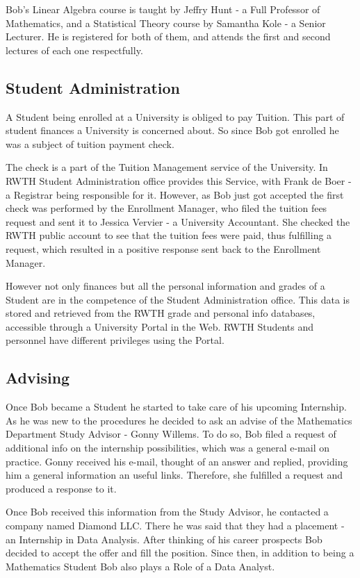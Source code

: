\documentclass{article}    %
\begin{document}
Bob's Linear Algebra course is taught by Jeffry Hunt - a Full Professor of Mathematics, and a Statistical Theory course by Samantha Kole - a Senior Lecturer. He is registered for both of them, and attends the first and second lectures of each one respectfully.
% 
\subsection{Student Administration}
%
A Student being enrolled at a University is obliged to pay Tuition. This part of student finances a University is concerned about. So since Bob got enrolled he was a subject of tuition payment check. 

The check is a part of the Tuition Management service of the University. In RWTH Student Administration office provides this Service, with Frank de Boer - a Registrar being responsible for it. However, as Bob just got accepted the first check was performed by the Enrollment Manager, who filed the tuition fees request and sent it to Jessica Vervier - a University Accountant. She checked the RWTH public account to see that the tuition fees were paid, thus fulfilling a request, which resulted in a positive response sent back to the Enrollment Manager.

However not only finances but all the personal information and grades of a Student are in the competence of the Student Administration office. This data is stored and retrieved from the RWTH grade and personal info databases, accessible through a University Portal in the Web. RWTH Students and personnel have different privileges using the Portal.
% 
\subsection{Advising}
%
Once Bob became a Student he started to take care of his upcoming Internship. As he was new to the procedures he decided to ask an advise of the Mathematics Department Study Advisor - Gonny Willems. To do so, Bob filed a request of additional info on the internship possibilities, which was a general e-mail on practice. Gonny received his e-mail, thought of an answer and replied, providing him a general information an useful links. Therefore, she fulfilled a request and produced a response to it.

Once Bob received this information from the Study Advisor, he contacted a company named Diamond LLC. There he was said that they had a placement - an Internship in Data Analysis. After thinking of his career prospects Bob decided to accept the offer and fill the position. Since then, in addition to being a Mathematics Student Bob also plays a Role of a Data Analyst.
% 
\end{document}
